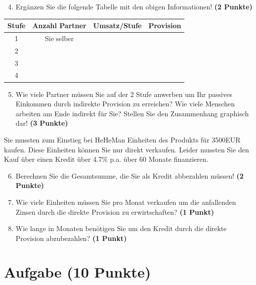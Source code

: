 \documentclass[a4paper, 9pt]{scrartcl}\usepackage[]{graphicx}\usepackage[]{xcolor}
\begin{document}
\begin{enumerate}
  \setcounter{enumi}{3}
\item Erg{\"a}nzen Sie die folgende Tabelle mit den obigen Informationen! \textbf{(2 Punkte)}
\end{enumerate}

\begin{center}
\begin{tabular}{c|c|c|c}
  \toprule
  \textbf{Stufe} & \textbf{Anzahl Partner}  & \textbf{Umsatz/Stufe} & \textbf{Provision}\\
  \midrule
  1 & Sie selber  &  & \\ \midrule
  2 &   &  &  \\ \midrule
  3 &   &  &  \\ \midrule
  4 &   &  &  \\
  \bottomrule
\end{tabular}
\end{center}

\begin{enumerate}
  \setcounter{enumi}{4}
\item Wie viele Partner m{\"u}ssen Sie auf der 2 Stufe anwerben um Ihr passives
  Einkommen durch indirekte Provision zu erreichen? Wie viele Menschen
  arbeiten am Ende indirekt f{\"u}r Sie? Stellen Sie den
  Zusammenhang graphisch dar!  \textbf{(3 Punkte)}
\end{enumerate}

Sie mussten zum Einstieg bei HeHeMan Einheiten des Produkts
f{\"u}r 3500EUR kaufen. Diese Einheiten k{\"o}nnen Sie nur direkt
verkaufen. Leider mussten Sie den Kauf {\"u}ber einen Kredit {\"u}ber
4.7\% p.a. {\"u}ber 60 Monate finanzieren.

\begin{enumerate}
  \setcounter{enumi}{5}
\item Berechnen Sie die Gesamtsumme, die Sie als Kredit abbezahlen m{\"u}ssen! \textbf{(2 Punkte)}
\item Wie viele Einheiten m{\"u}ssen Sie pro Monat verkaufen um die anfallenden Zinsen
  durch die direkte Provision zu erwirtschaften? \textbf{(1 Punkt)}
\item Wie lange in
  Monaten ben{\"o}tigen Sie um den Kredit durch die direkte
  Provision abzubezahlen? \textbf{(1 Punkt)}
\end{enumerate} 
\clearpage

\section{Aufgabe \hfill (10 Punkte)}
\end{document}
